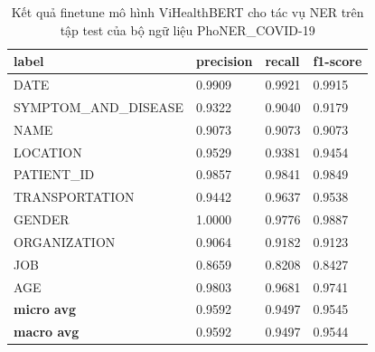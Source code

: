 \documentclass[12pt]{article}
\begin{document}
\begin{table}
\centering
\begin{tabular}{|l|l|l|l|}
\hline
\textbf{label}        & \textbf{precision} & \textbf{recall} & \textbf{f1-score} \\ \hline
DATE                  & 0.9909             & 0.9921          & 0.9915            \\ \hdashline
SYMPTOM\_AND\_DISEASE & 0.9322             & 0.9040          & 0.9179            \\ \hdashline
NAME                  & 0.9073             & 0.9073          & 0.9073            \\ \hdashline
LOCATION              & 0.9529             & 0.9381          & 0.9454            \\ \hdashline
PATIENT\_ID           & 0.9857             & 0.9841          & 0.9849            \\ \hdashline
TRANSPORTATION        & 0.9442             & 0.9637          & 0.9538            \\ \hdashline
GENDER                & 1.0000             & 0.9776          & 0.9887            \\ \hdashline
ORGANIZATION          & 0.9064             & 0.9182          & 0.9123            \\ \hdashline
JOB                   & 0.8659             & 0.8208          & 0.8427            \\ \hdashline
AGE                   & 0.9803             & 0.9681          & 0.9741            \\ \hline
\textbf{micro avg}    & 0.9592             & 0.9497          & 0.9545            \\ \hline
\textbf{macro avg}    & 0.9592             & 0.9497          & 0.9544            \\ \hline
\end{tabular}
\caption{Kết quả finetune mô hình ViHealthBERT cho tác vụ NER trên tập test của bộ ngữ liệu PhoNER\_COVID-19}
\label{tab:results-test}
\end{table}
\end{document}

